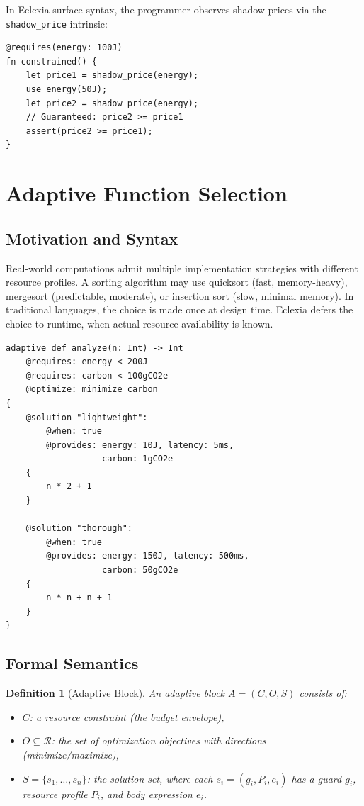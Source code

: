 \documentclass[11pt,a4paper]{article}
\newtheorem{definition}[theorem]{Definition}
\begin{document}
In Eclexia surface syntax, the programmer observes shadow prices via the
\texttt{shadow\_price} intrinsic:

\begin{lstlisting}
@requires(energy: 100J)
fn constrained() {
    let price1 = shadow_price(energy);
    use_energy(50J);
    let price2 = shadow_price(energy);
    // Guaranteed: price2 >= price1
    assert(price2 >= price1);
}
\end{lstlisting}


\section{Adaptive Function Selection}
\label{sec:adaptive-functions}

\subsection{Motivation and Syntax}

Real-world computations admit multiple implementation strategies with different
resource profiles.  A sorting algorithm may use quicksort (fast, memory-heavy),
mergesort (predictable, moderate), or insertion sort (slow, minimal memory).
In traditional languages, the choice is made once at design time.  Eclexia
defers the choice to runtime, when actual resource availability is known.

\begin{lstlisting}
adaptive def analyze(n: Int) -> Int
    @requires: energy < 200J
    @requires: carbon < 100gCO2e
    @optimize: minimize carbon
{
    @solution "lightweight":
        @when: true
        @provides: energy: 10J, latency: 5ms,
                   carbon: 1gCO2e
    {
        n * 2 + 1
    }

    @solution "thorough":
        @when: true
        @provides: energy: 150J, latency: 500ms,
                   carbon: 50gCO2e
    {
        n * n + n + 1
    }
}
\end{lstlisting}

\subsection{Formal Semantics}

\begin{definition}[Adaptive Block]
An adaptive block $A = (C, O, S)$ consists of:
\begin{itemize}
  \item $C$: a resource constraint (the budget envelope),
  \item $O \subseteq \mathcal{R}$: the set of optimization objectives with
    directions (minimize/maximize),
  \item $S = \{s_1, \ldots, s_n\}$: the solution set, where each
    $s_i = (g_i, P_i, e_i)$ has a guard $g_i$, resource profile $P_i$,
    and body expression $e_i$.
\end{itemize}
\end{definition}
\end{document}
